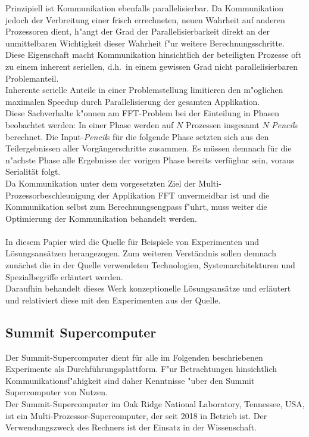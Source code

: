 Prinzipiell ist Kommunikation ebenfalls parallelisierbar. Da Kommunikation jedoch der Verbreitung einer frisch errechneten, neuen Wahrheit auf anderen Prozessoren dient, h"angt der Grad der Parallelisierbarkeit direkt an der unmittelbaren Wichtigkeit dieser Wahrheit f"ur weitere Berechnungsschritte.\\
Diese Eigenschaft macht Kommunikation hinsichtlich der beteiligten Prozesse oft zu einem inherent seriellen, d.h.~in einem gewissen Grad nicht parallelisierbaren Problemanteil.\\
Inherente serielle Anteile in einer Problemstellung limitieren den m"oglichen maximalen Speedup durch Parallelisierung der gesamten Applikation.\\
Diese Sachverhalte k"onnen am FFT-Problem bei der Einteilung in Phasen beobachtet werden: In einer Phase werden auf $N$ Prozessen insgesamt $N$ \textit{Pencil}s berechnet. Die Input-\textit{Pencil}s für die folgende Phase setzten sich aus den Teilergebnissen aller Vorgängerschritte zusammen. Es müssen demnach für die n"achste Phase alle Ergebnisse der vorigen Phase bereits verfügbar sein, voraus Serialität folgt.\\
Da Kommunikation unter dem vorgesetzten Ziel der Multi-Prozessorbeschleunigung der Applikation FFT unvermeidbar ist und die Kommunikation selbst zum Berechnungsengpass f"uhrt, muss weiter die Optimierung der Kommunikation behandelt werden.\\
\\
In diesem Papier wird die Quelle \cite{mainpaper} für Beispiele von Experimenten und Lösungsansätzen herangezogen. Zum weiteren Verständnis sollen demnach zunächst die in der Quelle verwendeten Technologien, Systemarchitekturen und Spezialbegriffe erläutert werden.\\
Daraufhin behandelt dieses Werk konzeptionelle Lösungsansätze und erläutert und relativiert diese mit den Experimenten aus der Quelle.


\subsection{Summit Supercomputer}
Der Summit-Supercomputer dient für alle im Folgenden beschriebenen Experimente als Durchführungsplattform. F"ur Betrachtungen hinsichtlich Kommunikationsf"ahigkeit sind daher Kenntnisse "uber den Summit Supercomputer von Nutzen.\\

Der Summit-Supercomputer im Oak Ridge National Laboratory, Tennessee, USA, ist ein Multi-Prozessor-Supercomputer, der seit 2018 in Betrieb ist. Der Verwendungszweck des Rechners ist der Einsatz in der Wissenschaft.

